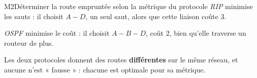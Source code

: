 \begin{fichemethode}{M2}{Déterminer la route empruntée selon la métrique du protocole}
\emph{RIP} minimise les sauts : il choisit $A\!-\!D$, un seul saut, alors que cette liaison
coûte $3$.

\emph{OSPF} minimise le coût : il choisit $A\!-\!B\!-\!D$, coût $2$, bien qu'elle traverse un
routeur de plus.

Les deux protocoles donnent des routes \textbf{différentes} sur le même réseau, et aucune
n'est « fausse » : chacune est optimale pour sa métrique.

%
%
%
%
%
%
%
%
%


\end{fichemethode}
